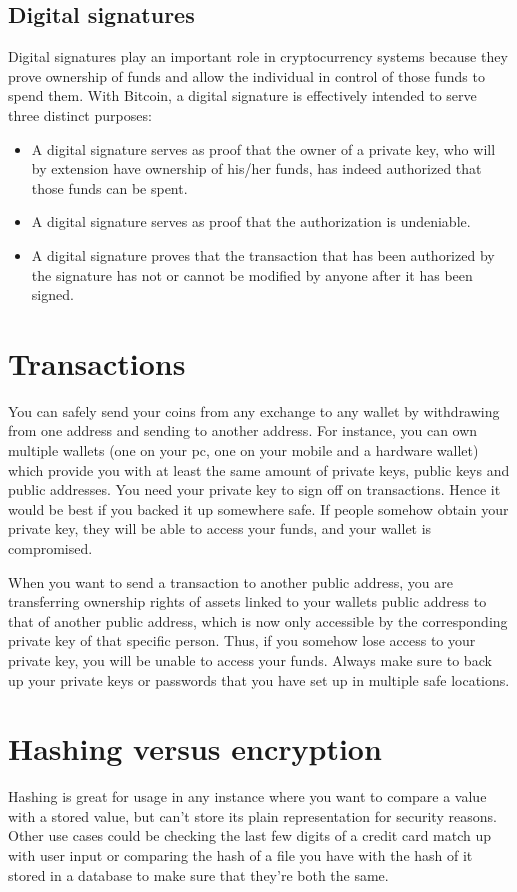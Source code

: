 \subsection{Digital signatures}
Digital signatures play an important role in cryptocurrency systems because they prove ownership of funds and allow the individual in control of those funds to spend them. With Bitcoin, a digital signature is effectively intended to serve three distinct purposes:

\begin{itemize}
\setlength\itemsep{0em}
    \item A digital signature serves as proof that the owner of a private key, who will by extension have ownership of his/her funds, has indeed authorized that those funds can be spent.
    \item A digital signature serves as proof that the authorization is undeniable.
    \item A digital signature proves that the transaction that has been authorized by the signature has not or cannot be modified by anyone after it has been signed.
\end{itemize}

\section{Transactions}
You can safely send your coins from any exchange to any wallet by withdrawing from one address and sending to another address. For instance, you can own multiple wallets (one on your pc, one on your mobile and a hardware wallet) which provide you with at least the same amount of private keys, public keys and public addresses. You need your private key to sign off on transactions. Hence it would be best if you backed it up somewhere safe. If people somehow obtain your private key, they will be able to access your funds, and your wallet is compromised.\medskip

When you want to send a transaction to another public address, you are transferring ownership rights of assets linked to your wallets public address to that of another public address, which is now only accessible by the corresponding private key of that specific person. Thus, if you somehow lose access to your private key, you will be unable to access your funds. Always make sure to back up your private keys or passwords that you have set up in multiple safe locations.

\section{Hashing versus encryption}
Hashing is great for usage in any instance where you want to compare a value with a stored value, but can't store its plain representation for security reasons. Other use cases could be checking the last few digits of a credit card match up with user input or comparing the hash of a file you have with the hash of it stored in a database to make sure that they're both the same.

